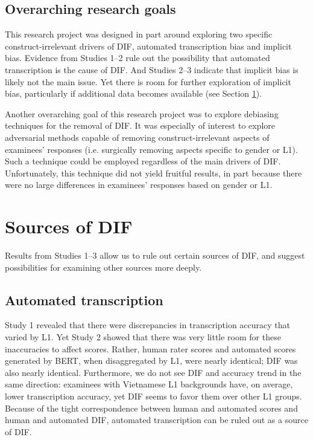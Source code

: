 \documentclass [PhD] {uclathes}
\begin{document}
\subsection{Overarching research goals}

This research project was designed in part around exploring two specific construct-irrelevant drivers of DIF, automated transcription bias and implicit bias. Evidence from Studies 1–2 rule out the possibility that automated transcription is the cause of DIF. And Studies 2–3 indicate that implicit bias is likely not the main issue. Yet there is room for further exploration of implicit bias, particularly if additional data becomes available (see Section \ref{sec:disc_sources}). 

Another overarching goal of this research project was to explore debiasing techniques for the removal of DIF. It was especially of interest to explore adversarial methods capable of removing construct-irrelevant aspects of examinees’ responses (i.e. surgically removing aspects specific to gender or L1). Such a technique could be employed regardless of the main drivers of DIF. Unfortunately, this technique did not yield fruitful results, in part because there were no large differences in examinees’ responses based on gender or L1. 

\section{Sources of DIF}
\label{sec:disc_sources}

Results from Studies 1–3 allow us to rule out certain sources of DIF, and suggest possibilities for examining other sources more deeply. 

\subsection{Automated transcription}

Study 1 revealed that there were discrepancies in transcription accuracy that varied by L1. Yet Study 2 showed that there was very little room for these inaccuracies to affect scores. Rather, human rater scores and automated scores generated by BERT, when disaggregated by L1, were nearly identical; DIF was also nearly identical. Furthermore, we do not see DIF and accuracy trend in the same direction: examinees with Vietnamese L1 backgrounds have, on average, lower transcription accuracy, yet DIF seems to favor them over other L1 groups. Because of the tight correspondence between human and automated scores and human and automated DIF, automated transcription can be ruled out as a source of DIF. 
\end{document}
